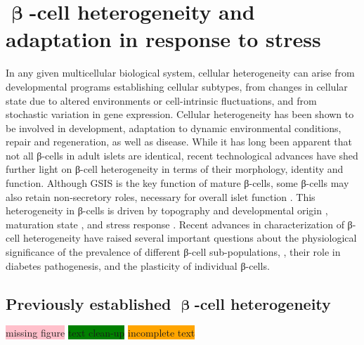 \clearpage




\section{\( \mathbf{\upbeta} \)-cell heterogeneity and adaptation in response to stress}

In any given multicellular biological system, cellular heterogeneity  can arise from developmental programs establishing cellular subtypes, from changes in cellular state due to altered environments or cell-intrinsic fluctuations, and from stochastic variation in gene expression. Cellular heterogeneity has been shown to be involved in development, adaptation to dynamic environmental conditions, repair and regeneration, as well as disease.
While it has long been apparent that not all β-cells in adult islets are identical, recent technological advances have shed further light on β-cell heterogeneity in terms of their morphology, identity and function. Although GSIS is the key function of mature β-cells, some β-cells may also retain non-secretory roles, necessary for overall islet function \textbf{\cite{liu_all_2017}}. This heterogeneity in β-cells is driven by topography and developmental origin \textbf{\cite{puri_plasticity_2015,roscioni_impact_2016}}, maturation state \textbf{\cite{salinno_-cell_2019}}, and stress response \textbf{\cite{xin_pseudotime_2018}}. Recent advances in characterization of β-cell heterogeneity have raised several important questions about the physiological significance of the prevalence of different β-cell sub-populations, , their role in diabetes pathogenesis, and the plasticity of individual β-cells.

\subsection{Previously established \( \mathbf{\upbeta} \)-cell heterogeneity}
\colorbox{pink}{missing figure} \colorbox{green}{text clean-up} \colorbox{orange}{incomplete text} \\
